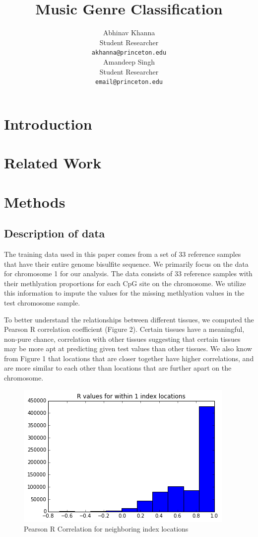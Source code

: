 \documentclass{article} %
\title{Music Genre Classification}
\author{
Abhinav Khanna\\
Student Researcher\\
\texttt{akhanna@princeton.edu} \\
\And
Amandeep Singh \\
Student Researcher \\
\texttt{email@princeton.edu} \\
}
\begin{document}
\maketitle

\begin{abstract}
\end{abstract}

\section{Introduction}


\section{Related Work}


\section{Methods}
\subsection{Description of data}
The training data used in this paper comes from a set of 33 reference samples that have their entire genome bisulfite sequence. We primarily focus on the data for chromosome 1 for our analysis. The data consists of 33 reference samples with their methlyation proportions for each CpG site on the chromosome. We utilize this information to impute the values for the missing methlyation values in the test chromosome sample.

To better understand the relationships between different tissues, we computed the Pearson R correlation coefficient (Figure 2). Certain tissues have a meaningful, non-pure chance, correlation with other tissues suggesting that certain tissues may be more apt at predicting given test values than other tissues. We also know from Figure 1 that locations that are closer together have higher correlations, and are more similar to each other than locations that are further apart on the chromosome.

\begin{figure}[!ht]
\begin{center}
\caption{Pearson R Correlation for neighboring index locations}
\begin{minipage}[b]{0.40\linewidth}
	\includegraphics[scale=0.40]{CorrelationByLocation.png}
\end{minipage}
\quad
\end{center}
\end{figure}
\end{document}
